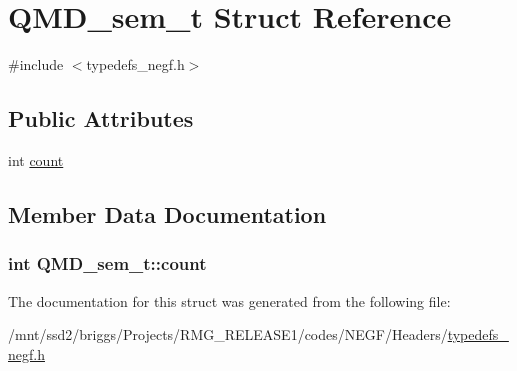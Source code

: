\hypertarget{struct_q_m_d__sem__t}{\section{Q\-M\-D\-\_\-sem\-\_\-t Struct Reference}
\label{struct_q_m_d__sem__t}
}


{\ttfamily \#include $<$typedefs\-\_\-negf.\-h$>$}

\subsection*{Public Attributes}
\begin{DoxyCompactItemize}
\item 
int \hyperlink{struct_q_m_d__sem__t_a9842f8468cf5775d951b889c715fa506}{count}
\end{DoxyCompactItemize}


\subsection{Member Data Documentation}
\hypertarget{struct_q_m_d__sem__t_a9842f8468cf5775d951b889c715fa506}{
\subsubsection[{count}]{\setlength{\rightskip}{0pt plus 5cm}int Q\-M\-D\-\_\-sem\-\_\-t\-::count}}\label{struct_q_m_d__sem__t_a9842f8468cf5775d951b889c715fa506}


The documentation for this struct was generated from the following file\-:\begin{DoxyCompactItemize}
\item 
/mnt/ssd2/briggs/\-Projects/\-R\-M\-G\-\_\-\-R\-E\-L\-E\-A\-S\-E1/codes/\-N\-E\-G\-F/\-Headers/\hyperlink{typedefs__negf_8h}{typedefs\-\_\-negf.\-h}\end{DoxyCompactItemize}
